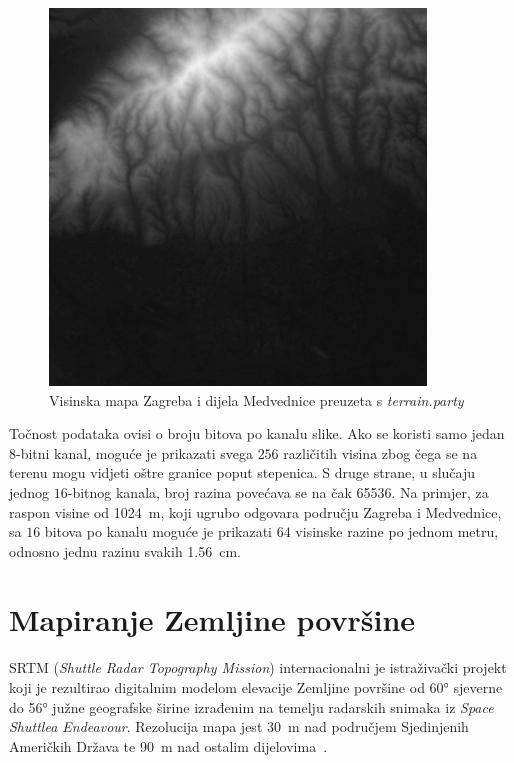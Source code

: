 \documentclass[times, utf8, zavrsni, numeric]{fer}
\begin{document}
		\begin{figure}
			\includegraphics[width=10cm]{figures/heightmap_zagreb_8bit.png}
			\centering
			\caption{Visinska mapa Zagreba i dijela Medvednice preuzeta s \textit{terrain.party}}
			\label{fig:heightmap_full_zagreb}
		\end{figure}
		
		Točnost podataka ovisi o broju bitova po kanalu slike.
		Ako se koristi samo jedan $8$-bitni kanal, moguće je prikazati svega $256$ različitih visina zbog čega se na terenu mogu vidjeti oštre granice poput stepenica.
		S druge strane, u slučaju jednog $16$-bitnog kanala, broj razina povećava se na čak \SI{65536}{}.
		Na primjer, za raspon visine od \SI{1024}{\meter}, koji ugrubo odgovara području Zagreba i Medvednice, sa $16$ bitova po kanalu moguće je prikazati $64$ visinske razine po jednom metru, odnosno jednu razinu svakih \SI{1.56}{\centi\meter}.
	
	
	
	\section{Mapiranje Zemljine površine}
	
		SRTM (\textit{Shuttle Radar Topography Mission}) internacionalni je istraživački projekt koji je rezultirao digitalnim modelom elevacije Zemljine površine od \ang{60} sjeverne do \ang{56} južne geografske širine izrađenim na temelju radarskih snimaka iz \textit{Space Shuttlea Endeavour}.
		Rezolucija mapa jest \SI{30}{\meter} nad područjem Sjedinjenih Američkih Država te \SI{90}{\meter} nad ostalim dijelovima~\cite{wiki:srtm}.
		
\end{document}
